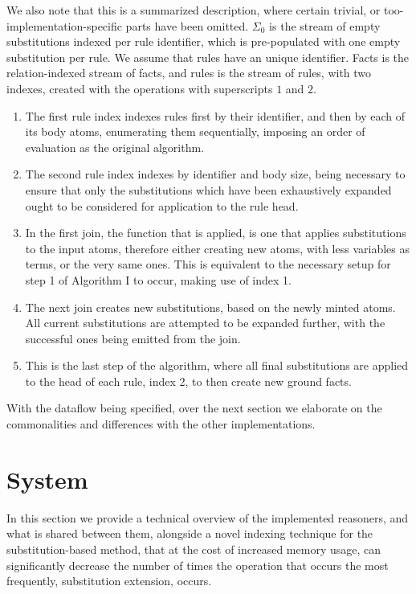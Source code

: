 \documentclass[sigconf,screen,review=false,natbib]{acmart}
\theoremstyle{definition}
\begin{document}
We also note that this is a summarized description, where certain trivial, or too-implementation-specific parts
have been omitted. $\Sigma_0$ is the stream of empty substitutions indexed per rule identifier, which is pre-populated
with one empty substitution per rule. We assume that rules have an unique identifier. Facts is the relation-indexed
stream of facts, and rules is the stream of rules, with two indexes, created with the operations with superscripts $1$ and $2$.
\begin{enumerate}
	\item The first rule index indexes rules first by their identifier, and then by each of its body atoms, enumerating
	      them sequentially, imposing an order of evaluation as the original algorithm.
	\item The second rule index indexes by identifier and body size, being necessary to ensure that only the substitutions
	      which have been exhaustively expanded ought to be considered for application to the rule head.
	\item In the first join, the function that is applied, is one that applies substitutions to the input atoms, therefore either creating new
	      atoms, with less variables as terms, or the very same ones. This is equivalent to the necessary setup for step 1
	      of Algorithm I to occur, making use of index 1.
	\item The next join creates new substitutions, based on the newly minted atoms. All current substitutions are attempted
	      to be expanded further, with the successful ones being emitted from the join.
	\item This is the last step of the algorithm, where all final substitutions are applied to the head of each rule, index
	      2, to then create new ground facts.
\end{enumerate}
With the dataflow being specified, over the next section we elaborate on the commonalities and differences with the other implementations.
\section{System}
In this section we provide a technical overview of the implemented reasoners, and what is shared between them, alongside
a novel indexing technique for the substitution-based method, that at the cost of increased memory usage, can significantly
decrease the number of times the operation that occurs the most frequently, substitution extension, occurs.
\end{document}
